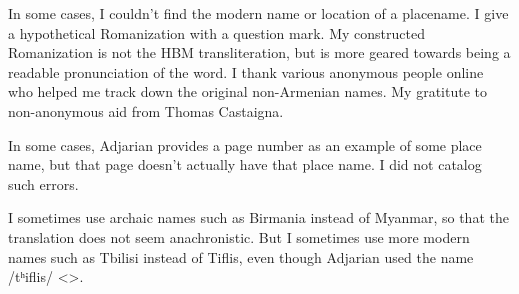 In some cases, I couldn't find the modern name or location of a placename. I give a hypothetical Romanization  with a question mark. My constructed Romanization is not the HBM transliteration, but is more geared towards being a readable pronunciation of the word. I thank various anonymous people online who helped me track down the original non-Armenian names. My gratitute to non-anonymous  aid from Thomas Castaigna.  

In some cases, Adjarian provides a page number as an example of some place name, but that page doesn't actually have that place name. I did not  catalog such errors. 

I sometimes use archaic names such as Birmania instead of Myanmar, so that the translation does not seem anachronistic. But I sometimes use more modern names such as Tbilisi instead of Tiflis, even though Adjarian used the name /tʰiflis/ <>.


